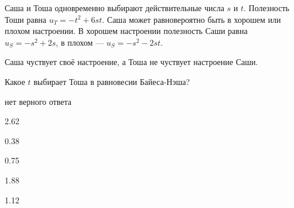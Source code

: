 
\begin{question}
Саша и Тоша одновременно выбирают действительные числа \(s\) и \(t\).
Полезность Тоши равна \(u_T = -t^2 + 6st\). Саша может равновероятно
быть в хорошем или плохом настроении. В хорошем настроении полезность
Саши равна \(u_S = -s^2 + 2s\), в плохом --- \(u_S = -s^2 - 2st\).

Саша чуствует своё настроение, а Тоша не чуствует настроение Саши.

Какое \(t\) выбирает Тоша в равновесии Байеса-Нэша?
\begin{answerlist}
  \item нет верного ответа
  \item 2.62
  \item 0.38
  \item 0.75
  \item 1.88
  \item 1.12
\end{answerlist}
\end{question}



